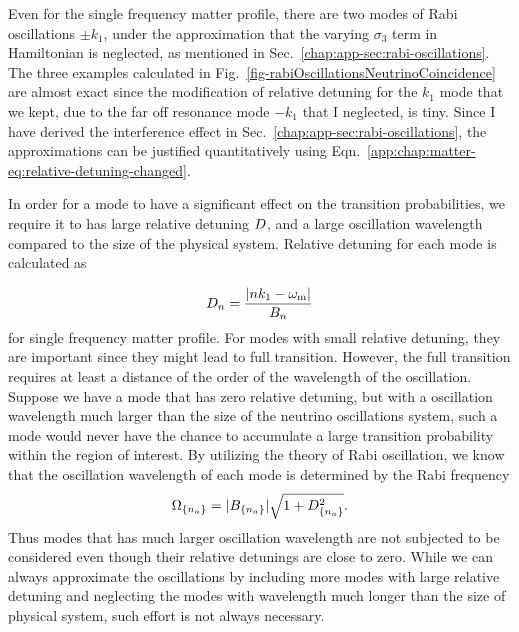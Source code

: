 Even for the single frequency matter profile, there are two modes of Rabi oscillations $\pm k_1$, under the approximation that the varying $\sigma_3$ term in Hamiltonian is neglected, as mentioned in Sec.~\ref{chap:app-sec:rabi-oscillations}. The three examples calculated in Fig.~\ref{fig-rabiOscillationsNeutrinoCoincidence} are almost exact since the modification of relative detuning for the $k_1$ mode that we kept, due to the far off resonance mode $-k_1$ that I neglected, is tiny. Since I have derived the interference effect in Sec.~\ref{chap:app-sec:rabi-oscillations}, the approximations can be justified quantitatively using Eqn.~\ref{app:chap:matter-eq:relative-detuning-changed}.

In order for a mode to have a significant effect on the transition probabilities, we require it to has large relative detuning $D$, and a large oscillation wavelength compared to the size of the physical system. Relative detuning for each mode is calculated as

\begin{equation}
D_n = \frac{\lvert n k_1 - \omega_{\mathrm{m}} \rvert}{B_n}
\end{equation}
for single frequency matter profile.
For modes with small relative detuning, they are important since they might lead to full transition. However, the full transition requires at least a distance of the order of the wavelength of the oscillation. Suppose we have a mode that has zero relative detuning, but with a oscillation wavelength much larger than the size of the neutrino oscillations system, such a mode would never have the chance to accumulate a large transition probability within the region of interest. By utilizing the theory of Rabi oscillation, we know that the oscillation wavelength of each mode is determined by the Rabi frequency
\begin{equation}
\Omega_{\{n_a\}} = \lvert B_{\{n_a\}} \rvert \sqrt{1+D_{\{n_a\}}^2}.
\end{equation}
Thus modes that has much larger oscillation wavelength are not subjected to be considered even though their relative detunings are close to zero. While we can always approximate the oscillations by including more modes with large relative detuning and neglecting the modes with wavelength much longer than the size of physical system, such effort is not always necessary.


